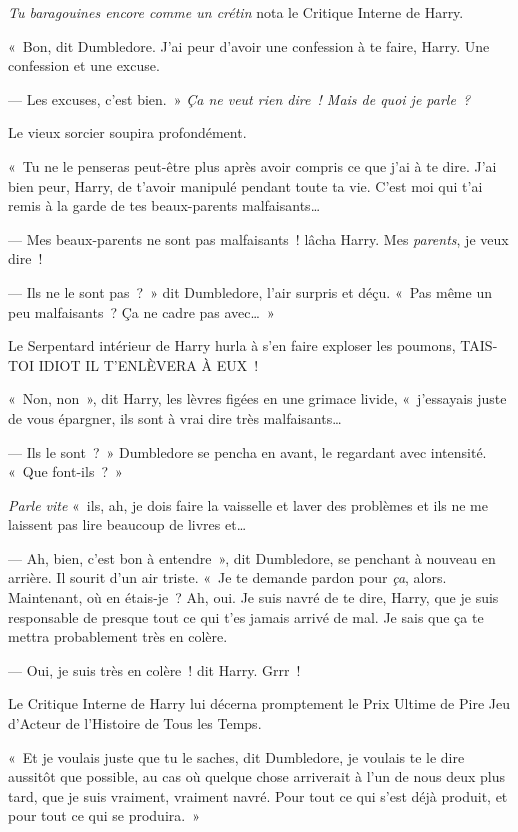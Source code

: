 \emph{Tu baragouines encore comme un crétin} nota le Critique Interne de Harry.

«~Bon, dit Dumbledore.
J'ai peur d'avoir une confession à te faire, Harry.
Une confession et une excuse.

--- Les excuses, c'est bien.~»
\emph{Ça ne veut rien dire~!
Mais de quoi je parle~?}

Le vieux sorcier soupira profondément.

«~Tu ne le penseras peut-être plus après avoir compris ce que j'ai à te dire.
J'ai bien peur, Harry, de t'avoir manipulé pendant toute ta vie.
C'est moi qui t'ai remis à la garde de tes beaux-parents malfaisants…

--- Mes beaux-parents ne sont pas malfaisants~! lâcha Harry.
Mes \emph{parents}, je veux dire~!

--- Ils ne le sont pas~?~»
dit Dumbledore, l'air surpris et déçu.
«~Pas même un peu malfaisants~?
Ça ne cadre pas avec…~»

Le Serpentard intérieur de Harry hurla à s'en faire exploser les poumons, TAIS-TOI IDIOT IL T'ENLÈVERA À EUX~!

«~Non, non~», dit Harry, les lèvres figées en une grimace livide, «~j'essayais juste de vous épargner, ils sont à vrai dire très malfaisants…

--- Ils le sont~?~»
Dumbledore se pencha en avant, le regardant avec intensité.
«~Que font-ils~?~»

\emph{Parle vite} «~ils, ah, je dois faire la vaisselle et laver des problèmes et ils ne me laissent pas lire beaucoup de livres et…

--- Ah, bien, c'est bon à entendre~», dit Dumbledore, se penchant à nouveau en arrière.
Il sourit d'un air triste.
«~Je te demande pardon pour \emph{ça}, alors.
Maintenant, où en étais-je~?
Ah, oui.
Je suis navré de te dire, Harry, que je suis responsable de presque tout ce qui t'es jamais arrivé de mal.
Je sais que ça te mettra probablement très en colère.

--- Oui, je suis très en colère~! dit Harry.
Grrr~!

Le Critique Interne de Harry lui décerna promptement le Prix Ultime de Pire Jeu d'Acteur de l'Histoire de Tous les Temps.

«~Et je voulais juste que tu le saches, dit Dumbledore, je voulais te le dire aussitôt que possible, au cas où quelque chose arriverait à l'un de nous deux plus tard, que je suis vraiment, vraiment navré.
Pour tout ce qui s'est déjà produit, et pour tout ce qui se produira.~»


